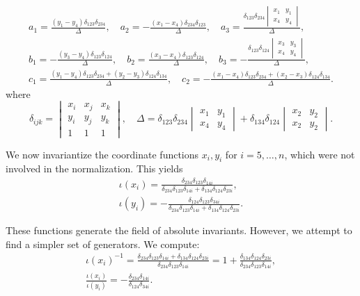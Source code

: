 \documentclass[12pt,reqno]{amsart}
\begin{document}
\begin{gather*}
a_{{1}}=\frac {(y_1-y_4)\delta_{123} \delta_{234}}{\Delta}, \quad
a_{{2}}=-\frac {(x_1-x_{{4}}) \delta_{234} \delta_{123}}{\Delta}, \quad
a_{{3}}=\frac {\delta_{123} \delta_{234} \begin{vmatrix} x_1 & y_1 \\ x_4 & y_4\end{vmatrix}}{\Delta},
\\
b_{{1}}=-\frac { (y_3-y_4)\delta_{123} \delta_{124}}{\Delta}, \quad 
b_{{2}}={\frac {(x_3-x_4)\delta_{123} \delta_{124}}{\Delta}}, \quad
b_{{3}}=-{\frac { \delta_{123} \delta_{124} \begin{vmatrix} x_3 & y_3 \\ x_4 & y_4\end{vmatrix} }{\Delta}},
\\
c_1=\frac{(y_1-y_4) \delta_{123} \delta_{234}+(y_2-y_3) \delta_{124} \delta_{134}}{\Delta
}, \quad
c_2=-\frac{(x_1-x_4) \delta_{123} \delta_{234}+(x_2-x_3) \delta_{124} \delta_{134}}{\Delta
}.
\end{gather*}
where   
$$ \delta_{ijk}=\begin{vmatrix} x_i & x_j & x_k \\ y_i & y_j & y_k \\ 1 & 1 & 1 \end{vmatrix},  \quad \Delta= \delta_{123} \delta_{234} \begin{vmatrix} x_1 & y_1 \\ x_4 & y_4\end{vmatrix}+\delta_{134} \delta_{124} \begin{vmatrix} x_2 & y_2 \\ x_2 & y_2\end{vmatrix}.$$

We now invariantize the coordinate functions \(x_i, y_i\) for \(i = 5, \ldots, n\), which were not involved in the normalization. This yields
\begin{gather*}
\iota(x_i) = \frac{\delta_{234} \delta_{123} \delta_{14i}}{\delta_{234} \delta_{123} \delta_{14i} + \delta_{134} \delta_{124} \delta_{23i}}, \\
\iota(y_i) = -\frac{\delta_{124} \delta_{123} \delta_{34i}}{\delta_{234} \delta_{123} \delta_{14i} + \delta_{134} \delta_{124} \delta_{23i}}.
\end{gather*}

These functions generate the field of absolute invariants. However, we attempt to find a simpler set of generators. We compute:
\begin{gather*}
\iota(x_i)^{-1} = \frac{\delta_{234} \delta_{123} \delta_{14i} + \delta_{134} \delta_{124} \delta_{23i}}{\delta_{234} \delta_{123} \delta_{14i}} = 1 + \frac{\delta_{134} \delta_{124} \delta_{23i}}{\delta_{234} \delta_{123} \delta_{14i}}, \\
\frac{\iota(x_i)}{\iota(y_i)} = -\frac{\delta_{234} \delta_{14i}}{\delta_{124} \delta_{34i}}.
\end{gather*}
\end{document}
